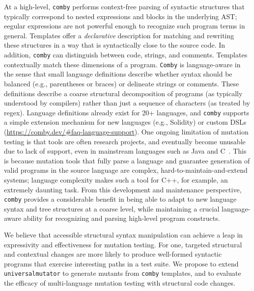 At a high-level, {\tt comby} performs
context-free
parsing of syntactic structures that typically correspond to nested
expressions and blocks in the underlying AST; eegular expressions are not powerful enough to recognize such program terms in general. Templates offer a \emph{declarative} description for matching and rewriting these structures in a way that is syntactically close to the source code.
In addition, {\tt comby} can distinguish between code, strings, and comments. Templates contextually match these dimensions of a program. %
{\tt Comby} is language-aware in the sense that small language
definitions describe whether syntax should be balanced (e.g.,
parentheses or braces) or delineate strings or comments. These
definitions describe a coarse structural decomposition of programs (as
typically understood by compilers) rather than just a sequence of
characters (as treated by regex). Language definitions already exist
for 20+ languages, and {\tt comby} supports a simple extension
mechanism for new languages (e.g., Solidity) or custom DSLs (\url{https://comby.dev/\#faq-language-support}).
One ongoing limitation of mutation testing is that tools are often research
projects, and eventually become unusable due to lack of support, even in
mainstream languages such as Java and C~\cite{MutChoice}.
This is because mutation tools that fully parse a language and guarantee generation of
valid programs in the source language are complex, hard-to-maintain-and-extend
systems; language complexity makes such a tool for C++, for example, an extremely daunting task. From this development and maintenance perspective, {\tt comby} provides a considerable benefit in being able to adapt to new language syntax and tree structures at a coarse level, while maintaining a crucial language-aware ability for recognizing and parsing high-level program constructs.

We believe that accessible structural syntax manipulation can achieve a leap in
expressivity and effectiveness for mutation testing. %
For one, targeted structural and contextual changes are
more likely to produce well-formed syntactic programs
that exercise interesting paths in a test suite.
We propose to extend {\tt universalmutator}
to generate mutants from {\tt comby} templates, and to evaluate the efficacy of
multi-language mutation testing with structural code changes.

